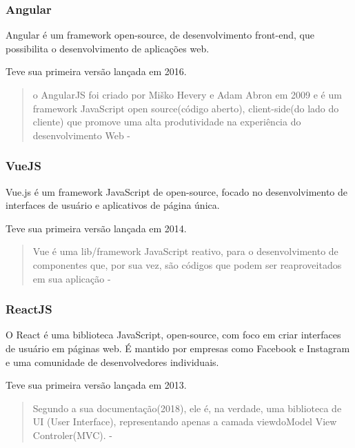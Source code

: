 \subsubsection{Angular}

Angular é um framework open-source, de desenvolvimento front-end, que possibilita o desenvolvimento de aplicações web.

Teve sua primeira versão lançada em 2016.

\begin{quote}
  o AngularJS foi criado por Miško Hevery e Adam Abron  em  2009  e  é  um  framework  JavaScript open  source(código  aberto), client-side(do lado  do  cliente)  que  promove  uma  alta  produtividade  na  experiência  do  desenvolvimento Web - \cite{ferreira2018analise}
\end{quote}


\subsubsection{VueJS}

Vue.js é um framework JavaScript de open-source, focado no desenvolvimento de interfaces de usuário e aplicativos de página única.

Teve sua primeira versão lançada em 2014.

\begin{quote}
  Vue é uma lib/framework JavaScript reativo, para  o  desenvolvimento  de  componentes  que,  por  sua  vez,  são  códigos  que  podem  ser reaproveitados em sua aplicação - \cite{ferreira2018analise}
\end{quote}


\subsubsection{ReactJS}

O React é uma biblioteca JavaScript, open-source, com foco em criar interfaces de usuário em páginas web. É mantido por empresas como Facebook e Instagram e uma comunidade de desenvolvedores individuais. 

Teve sua primeira versão lançada em 2013.

\begin{quote}
  Segundo a sua documentação(2018), ele é, na  verdade,  uma  biblioteca  de  UI  (User  Interface),  representando  apenas  a  camada viewdoModel  View  Controler(MVC).  - \cite{ferreira2018analise}
\end{quote}

